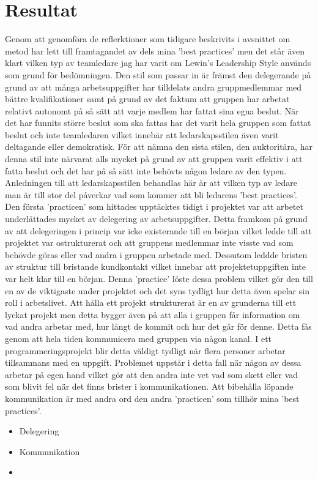 \section{Resultat}
Genom att genomföra de reflerktioner som tidigare beskrivits i avsnittet om metod har lett till framtagandet av dels mina 'best practices' men det står även klart vilken typ av teamledare jag har varit om Lewin's Leadership Style används som grund för bedömningen. Den stil som passar in är främst den delegerande på grund av att många arbetsuppgifter har tilldelats andra gruppmedlemmar med bättre kvalifikationer samt på grund av det faktum att gruppen har arbetat relativt autonomt på så sätt att varje medlem har fattat sina egna beslut. När det har funnits större beslut som ska fattas har det varit hela gruppen som fattat beslut och inte teamledaren vilket innebär att ledarskapsstilen även varit deltagande eller demokratisk. För att nämna den sista stilen, den auktoritära, har denna stil inte närvarat alls mycket på grund av att gruppen varit effektiv i att fatta beslut och det har på så sätt inte behövts någon ledare av den typen.
\newline \newline
Anledningen till att ledarskapsstilen behandlas här är att vilken typ av ledare man är till stor del påverkar vad som kommer att bli ledarens 'best practices'. Den första 'practicen' som hittades upptäcktes tidigt i projektet var att arbetet underlättades mycket av delegering av arbetsuppgifter. Detta framkom på grund av att delegeringen i princip var icke existerande till en början vilket ledde till att projektet var ostrukturerat och att gruppens medlemmar inte visste vad som behövde göras eller vad andra i gruppen arbetade med. Dessutom leddde bristen av struktur till bristande kundkontakt vilket innebar att projektetuppgiften inte var helt klar till en början. Denna 'practice' löste dessa problem vilket gör den till en av de viktigaste under projektet och det syns tydligt hur detta även spelar sin roll i arbetslivet. 
\newline \newline
Att hålla ett projekt strukturerat är en av grunderna till ett lyckat projekt men detta bygger även på att alla i gruppen får information om vad andra arbetar med, hur långt de kommit och hur det går för denne. Detta fås genom att hela tiden kommunicera med gruppen via någon kanal. I ett programmeringsprojekt blir detta väldigt tydligt när flera personer arbetar tillsammans med en uppgift. Problemet uppstår i detta fall när någon av dessa arbetar på egen hand vilket gör att den andra inte vet vad som skett eller vad som blivit fel när det finns brister i kommunikationen. Att bibehålla löpande kommunikation är med andra ord den andra 'practicen' som tillhör mina 'best practices'.

\begin{itemize}
	\item Delegering
	\item Kommunikation
	\item
\end{itemize}